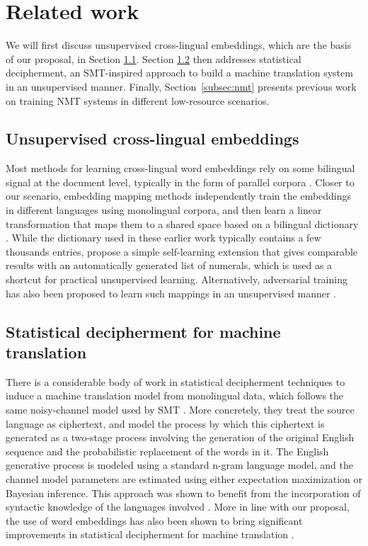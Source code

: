 \documentclass{article} \usepackage{iclr2018_conference,times}
\begin{document}
\section{Related work} 
\label{sec:related_work}

We will first discuss unsupervised cross-lingual embeddings, which are the basis of our proposal, in Section \ref{subsec:xlingual_embeddings}. Section \ref{subsec:decipherment} then addresses statistical decipherment, an SMT-inspired approach to build a machine translation system in an unsupervised manner. Finally, Section~\ref{subsec:nmt} presents previous work on training NMT systems in different low-resource scenarios.

\subsection{Unsupervised cross-lingual embeddings} \label{subsec:xlingual_embeddings}

Most methods for learning cross-lingual word embeddings rely on some bilingual signal at the document level, typically in the form of parallel corpora \citep{gouws2015bilbowa,luong2015bilingual}. Closer to our scenario, embedding mapping methods independently train the embeddings in different languages using monolingual corpora, and then learn a linear transformation that maps them to a shared space based on a bilingual dictionary \citep{mikolov2013exploiting,lazaridou2015hubness,artetxe2016learning,smith2017offline}. While the dictionary used in these earlier work typically contains a few thousands entries, \citet{artetxe2017learning} propose a simple self-learning extension that gives comparable results with an automatically generated list of numerals, which is used as a shortcut for practical unsupervised learning. Alternatively, adversarial training has also been proposed to learn such mappings in an unsupervised manner \citep{micelibarone2016towards,zhang2017adversarial}.


\subsection{Statistical decipherment for machine translation} 
\label{subsec:decipherment}

There is a considerable body of work in statistical decipherment techniques to induce a machine translation model from monolingual data, which follows the same noisy-channel model used by SMT \citep{ravi2011deciphering,dou2012large}. More concretely, they treat the source language as ciphertext, and model the process by which this ciphertext is generated as a two-stage process involving the generation of the original English sequence and the probabilistic replacement of the words in it. The English generative process is modeled using a standard n-gram language model, and the channel model parameters are estimated using either expectation maximization or Bayesian inference. This approach was shown to benefit from the incorporation of syntactic knowledge of the languages involved \citep{dou2013dependency,dou2015unifying}. More in line with our proposal, the use of word embeddings has also been shown to bring significant improvements in statistical decipherment for machine translation \citep{dou2015unifying}.
\end{document}
